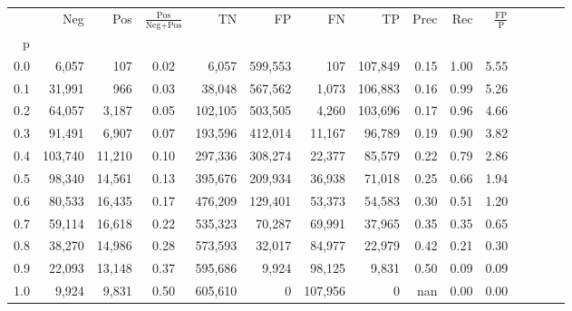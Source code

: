 \begin{tabular}{rrrcrrrrrrrrrrr}
\toprule
{} &      Neg &     Pos & $\frac{\text{Pos}}{\text{Neg}+\text{Pos}}$ &       TN &       FP &       FN &       TP &  Prec &   Rec & $\frac{\text{FP}}{\text{P}}$ \\
p   &          &         &                                            &          &          &          &          &       &       &                              \\
\midrule
0.0 &    6,057 &     107 &                                       0.02 &    6,057 &  599,553 &      107 &  107,849 &  0.15 &  1.00 &                         5.55 \\
0.1 &   31,991 &     966 &                                       0.03 &   38,048 &  567,562 &    1,073 &  106,883 &  0.16 &  0.99 &                         5.26 \\
0.2 &   64,057 &   3,187 &                                       0.05 &  102,105 &  503,505 &    4,260 &  103,696 &  0.17 &  0.96 &                         4.66 \\
0.3 &   91,491 &   6,907 &                                       0.07 &  193,596 &  412,014 &   11,167 &   96,789 &  0.19 &  0.90 &                         3.82 \\
0.4 &  103,740 &  11,210 &                                       0.10 &  297,336 &  308,274 &   22,377 &   85,579 &  0.22 &  0.79 &                         2.86 \\
0.5 &   98,340 &  14,561 &                                       0.13 &  395,676 &  209,934 &   36,938 &   71,018 &  0.25 &  0.66 &                         1.94 \\
0.6 &   80,533 &  16,435 &                                       0.17 &  476,209 &  129,401 &   53,373 &   54,583 &  0.30 &  0.51 &                         1.20 \\
0.7 &   59,114 &  16,618 &                                       0.22 &  535,323 &   70,287 &   69,991 &   37,965 &  0.35 &  0.35 &                         0.65 \\
0.8 &   38,270 &  14,986 &                                       0.28 &  573,593 &   32,017 &   84,977 &   22,979 &  0.42 &  0.21 &                         0.30 \\
0.9 &   22,093 &  13,148 &                                       0.37 &  595,686 &    9,924 &   98,125 &    9,831 &  0.50 &  0.09 &                         0.09 \\
1.0 &    9,924 &   9,831 &                                       0.50 &  605,610 &        0 &  107,956 &        0 &   nan &  0.00 &                         0.00 \\
\bottomrule
\end{tabular}
